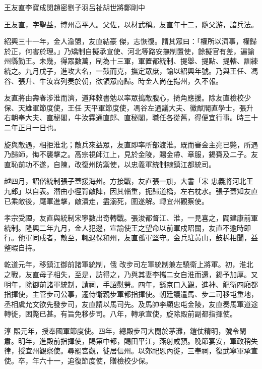 
\begin{pinyinscope}

 王友直李寶成閔趙密劉子羽呂祉胡世將鄭剛中



 王友直，字聖益，博州高平人。父佐，以材武稱。友直年十二，隨父游，諳兵法。



 紹興三十一年，金人渝盟，友直結豪
 傑，志恢復。謂其眾曰：「權所以濟事，權歸於正，何害於理。」乃矯制自擬承宣使、河北等路安撫制置使，餘擬官有差，遍諭州縣勤王。未幾，得眾數萬，制為十三軍，軍置都統制、提舉、提點、提轄、訓練統之。九月戊子，進攻大名，一鼓而克，撫定眾庶，諭以紹興年號。乃與王任、馮谷、張升、牛汝霖列奏於朝，欲領眾南歸。時金人尚在揚州，久不報。



 友直將由壽春涉淮而濟，道拜敕書勉以率眾搗敵腹心，掎角應援。除友直檢校少保、天雄軍節度使，王任
 天平軍節度使，馮谷左通議大夫、徽猷閣直學士，張升右朝奉大夫、直秘閣，牛汝霖通直郎、直秘閣，職任各從舊，得便宜行事。時三十二年正月一日也。



 旋與敵遇，相拒淮北；敵兵來益眾，友直即率所部渡淮。既而審金主亮已斃，所遇乃歸師，悔不襲擊之。高宗視師江上，見於金陵，賜金帶、章服，錫賚及二子。友直恥前功不遂，自陳，改復州防禦使，以忠義軍統制隸鎮江都統司。



 越四月，詔偕統制張子蓋援海州。方接戰，友直張一旗，大書「宋
 忠義將河北王九郎」以自表。潛由小徑背敵陣，因其輜重，扼歸道橋，左右枕水。張子蓋知友直已乘敵後，麾軍進擊，敵潰走，盡溺死，圍遂解。轉宜州觀察使。



 孝宗受禪，友直與統制宋寧數出奇轉戰。張浚都督江、淮，一見喜之，闢建康前軍統制。隆興二年九月，金人犯邊，宣諭使王之望命以前軍戍昭關，友直不逾時即行。他軍同戍者，敵至，輒退保和州，友直孤軍堅守。金兵駐黃山，鼓柝相聞，益整暇自持。



 乾道元年，移鎮江御前諸軍統制，俄
 改步司左軍統制兼左驍衛上將軍。初，淮北之戰，友直母子相失，至是，訪得之，乃與其妻李攜二女自淮而還，錫予加厚。又明年，除御前諸軍統制，請祠，手詔慰勞。四年，繇京口入覲，進神、龍衛四廂都指揮使，主管步司公事，遷侍衛親步軍都指揮使。朝廷議遣馬、步二司移屯重地，丞相虞允文欲先發步司，友直請以馬司先。及馬帥李顯忠屯金陵，友直奏馬軍道途轉徙，困斃已甚。有旨免移步司。八年，轉承宣使，旋除殿前副都指揮使。



 淳
 熙元年，授奉國軍節度使。四年，總殿步司大閱於茅灘，鎧仗精明，號令閑肅。明年，進殿前指揮使，賜第中都，賜田平江，燕射咸預。晚節宴安，軍政稍失律，授宜州觀察使。尋罷宮觀，徙居信州。以郊祀恩內徙，三奉祠，復武寧軍承宣使。卒，年六十一，追復節度使，贈檢校少保。




\end{pinyinscope}
